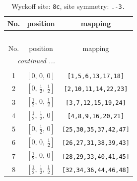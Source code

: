 \documentclass[fleqn,8pt]{jsarticle}
\begin{document}
\renewcommand{\arraystretch}{1.2}
\begin{longtable}{ccc}
\caption{Wyckoff site: {\tt 8c}, site symmetry: {\tt .-3.}}
 \\
 \hline \hline
No. & position & mapping \\ \hline \endfirsthead

\multicolumn{2}{l}{\tablename\ \thetable{}} \\
 \hline \hline
No. & position & mapping \\ \hline \endhead

 \hline \hline
\multicolumn{2}{r}{\footnotesize\it continued ...} \\ \endfoot

 \hline \hline
\multicolumn{2}{r}{} \\ \endlastfoot

1 & $\left[ 0,\, 0,\, 0 \right]$ & {\tt [1,5,6,13,17,18]} \\ \hline
2 & $\left[ 0,\, \frac{1}{2},\, \frac{1}{2} \right]$ & {\tt [2,10,11,14,22,23]} \\ \hline
3 & $\left[ \frac{1}{2},\, 0,\, \frac{1}{2} \right]$ & {\tt [3,7,12,15,19,24]} \\ \hline
4 & $\left[ \frac{1}{2},\, \frac{1}{2},\, 0 \right]$ & {\tt [4,8,9,16,20,21]} \\ \hline
5 & $\left[ 0,\, \frac{1}{2},\, 0 \right]$ & {\tt [25,30,35,37,42,47]} \\ \hline
6 & $\left[ 0,\, 0,\, \frac{1}{2} \right]$ & {\tt [26,27,31,38,39,43]} \\ \hline
7 & $\left[ \frac{1}{2},\, 0,\, 0 \right]$ & {\tt [28,29,33,40,41,45]} \\ \hline
8 & $\left[ \frac{1}{2},\, \frac{1}{2},\, \frac{1}{2} \right]$ & {\tt [32,34,36,44,46,48]} \\
\end{longtable}
\renewcommand{\arraystretch}{1.2}
\end{document}
